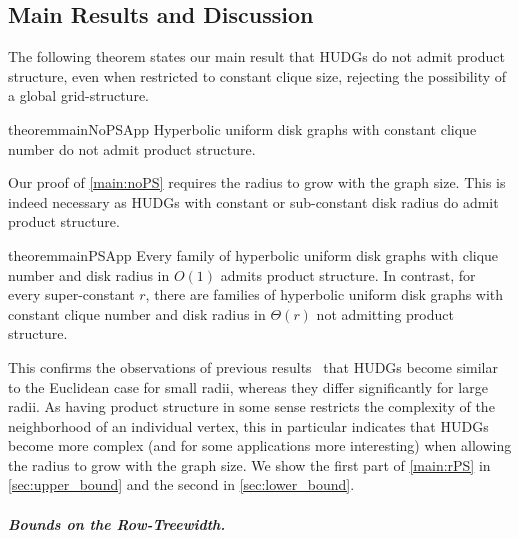 \documentclass[a4paper,english,cleveref,thm-restate]{lipics-v2021}
\begin{document}
\subsection{Main Results and Discussion}

The following theorem states our main result that HUDGs do not admit product structure, even when restricted to constant clique size, rejecting the possibility of a global grid-structure. 
%
\begin{restatable}{theorem}{mainNoPSApp}\label{main:noPS}
    Hyperbolic uniform disk graphs with constant clique number do not admit product structure.
\end{restatable}
%
Our proof of \cref{main:noPS} requires the radius to grow with the graph size.
This is indeed necessary as HUDGs with constant or sub-constant disk radius do admit product structure.
%
\begin{restatable}{theorem}{mainPSApp}\label{main:rPS}
    Every family of hyperbolic uniform disk graphs with clique number and disk radius in $ O(1) $ admits product structure.
    In contrast, for every super-constant $ r $, there are families of hyperbolic uniform disk graphs with constant clique number and disk radius in  $ \Theta(r) $ not admitting product structure.
\end{restatable}%
%
This confirms the observations of previous results~\cite{Struc_Indep_Hyper_Unifor_Disk_Graph-Blaesius25,blasius_strongly_2023} that HUDGs become similar to the Euclidean case for small radii, whereas they differ significantly for large radii.
As having product structure in some sense restricts the complexity of the neighborhood of an individual vertex, this in particular indicates that HUDGs become more complex (and for some applications more interesting) when allowing the radius to grow with the graph size.
We show the first part of \cref{main:rPS} in \cref{sec:upper_bound} and the second in \cref{sec:lower_bound}.

\subparagraph{Bounds on the Row-Treewidth.}
\end{document}
